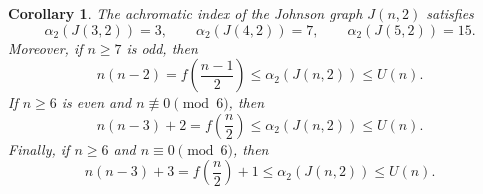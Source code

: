 \documentclass{article}
\newtheorem{corollary}[theorem]{Corollary}
\newcommand{\blue}[1]{\textcolor{blue}{#1}}
\newcommand{\red}[1]{\textcolor{red}{#1}}
\def\greeen{\textcolor[RGB]{47, 141, 26 }}
\begin{document}
    



    
    

\begin{corollary}\label{mainth}
The achromatic index of the Johnson graph $J(n,2)$ satisfies
$$
\alpha_2(J(3,2))=3,\qquad
\alpha_2(J(4,2))=7,\qquad
\alpha_2(J(5,2))=15.
$$
Moreover, if $n\geq 7$ is odd, then
$$
n(n-2)
=
f\left(\frac{n-1}{2}\right)
\leq
\alpha_2(J(n,2))
\leq
U(n).
$$
If $n\geq 6$ is even and $n\not\equiv 0\pmod{6}$, then
$$
n(n-3)+2
=
f\left(\frac{n}{2}\right)
\leq
\alpha_2(J(n,2))
\leq
U(n).
$$
Finally, if $n\geq 6$ and $n\equiv 0\pmod{6}$, then
$$
n(n-3)+3
=
f\left(\frac{n}{2}\right)+1
\leq
\alpha_2(J(n,2))
\leq
U(n).
$$

\end{corollary}
\end{document}
